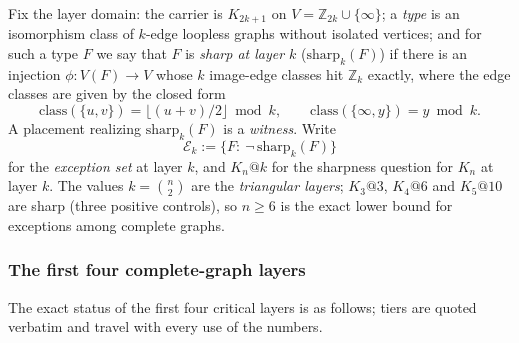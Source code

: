 Fix the layer domain: the carrier is $K_{2k+1}$ on
$V=\mathbb{Z}_{2k}\cup\{\infty\}$; a \emph{type} is an isomorphism class of
$k$-edge loopless graphs without isolated vertices; and for such a type $F$
we say that $F$ is \emph{sharp at layer $k$} ($\mathrm{sharp}_k(F)$) if
there is an injection $\phi:V(F)\to V$ whose $k$ image-edge classes hit
$\mathbb{Z}_k$ exactly, where the edge classes are given by the closed
form
\begin{equation}\label{eq:claclass}
\mathrm{class}(\{u,v\})=\bigl\lfloor(u+v)/2\bigr\rfloor \bmod k,
\qquad
\mathrm{class}(\{\infty,y\})=y \bmod k .
\end{equation}
A placement realizing $\mathrm{sharp}_k(F)$ is a \emph{witness}. Write
\[
\mathcal{E}_k:=\{F:\ \neg\,\mathrm{sharp}_k(F)\}
\]
for the \emph{exception set} at layer $k$, and $K_n@k$ for the sharpness
question for $K_n$ at layer $k$. The values $k=\binom n2$ are the
\emph{triangular layers}; $K_3@3$, $K_4@6$ and $K_5@10$ are sharp (three
positive controls), so $n\ge6$ is the exact lower bound for exceptions
among complete graphs.

\subsubsection{The first four complete-graph layers}\label{subsubsec:firstlayers}

The exact status of the first four critical layers is as follows; tiers
are quoted verbatim and travel with every use of the numbers.

